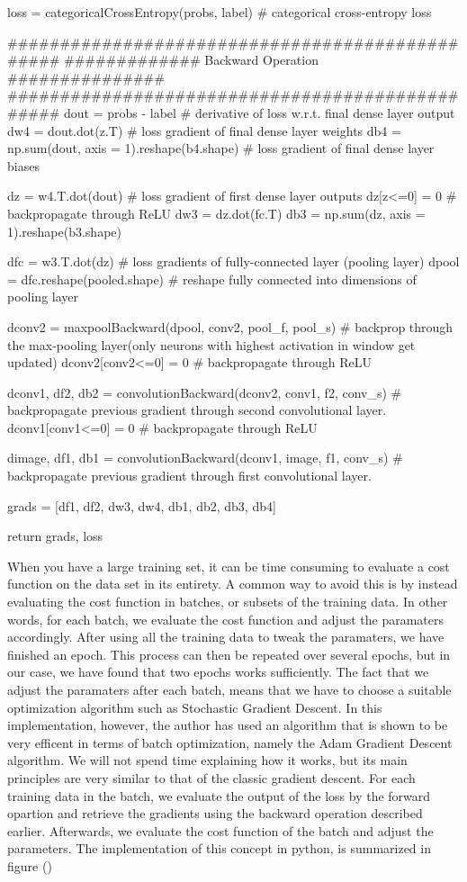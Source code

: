     loss = categoricalCrossEntropy(probs, label) # categorical cross-entropy loss
        
    ################################################
    ############# Backward Operation ###############
    ################################################
    dout = probs - label # derivative of loss w.r.t. final dense layer output
    dw4 = dout.dot(z.T) # loss gradient of final dense layer weights
    db4 = np.sum(dout, axis = 1).reshape(b4.shape) # loss gradient of final dense layer biases
    
    dz = w4.T.dot(dout) # loss gradient of first dense layer outputs 
    dz[z<=0] = 0 # backpropagate through ReLU 
    dw3 = dz.dot(fc.T)
    db3 = np.sum(dz, axis = 1).reshape(b3.shape)
    
    dfc = w3.T.dot(dz) # loss gradients of fully-connected layer (pooling layer)
    dpool = dfc.reshape(pooled.shape) # reshape fully connected into dimensions of pooling layer
    
    dconv2 = maxpoolBackward(dpool, conv2, pool_f, pool_s) # backprop through the max-pooling layer(only neurons with highest activation in window get updated)
    dconv2[conv2<=0] = 0 # backpropagate through ReLU
    
    dconv1, df2, db2 = convolutionBackward(dconv2, conv1, f2, conv_s) # backpropagate previous gradient through second convolutional layer.
    dconv1[conv1<=0] = 0 # backpropagate through ReLU
    
    dimage, df1, db1 = convolutionBackward(dconv1, image, f1, conv_s) # backpropagate previous gradient through first convolutional layer.
    
    grads = [df1, df2, dw3, dw4, db1, db2, db3, db4] 
    
    return grads, loss
\stoptyping

\startsection[title=Batch Optimization]
When you have a large training set, it can be time consuming to evaluate a cost function on the data set in its entirety.
A common way to avoid this is by instead evaluating the cost function in batches, or subsets of the training data.
In other words, for each batch, we evaluate the cost function and adjust the paramaters accordingly. 
After using all the training data to tweak the paramaters, we have finished an epoch.
This process can then be repeated over several epochs, but in our case, we have found that two epochs works sufficiently.
The fact that we adjust the paramaters after each batch, means that we have to choose a suitable optimization algorithm such as Stochastic Gradient Descent.
In this implementation, however, the author has used an algorithm that is shown to be very efficent in terms of batch optimization, namely the Adam Gradient Descent algorithm.
We will not spend time explaining how it works, but its main principles are very similar to that of the classic gradient descent.
For each training data in the batch, we evaluate the output of the loss by the forward opartion and retrieve the gradients using the backward operation described earlier. 
Afterwards, we evaluate the cost function of the batch and adjust the parameters.
The implementation of this concept in python, is summarized in figure ()



